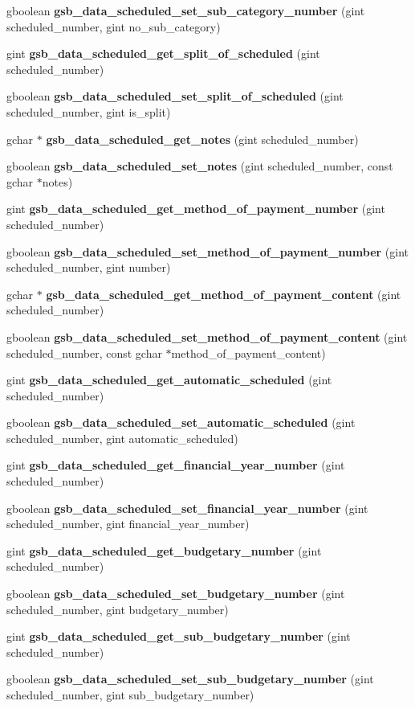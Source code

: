 \begin{DoxyCompactItemize}
gboolean {\bf gsb\_\-data\_\-scheduled\_\-set\_\-sub\_\-category\_\-number} (gint scheduled\_\-number, gint no\_\-sub\_\-category)
\item 
gint {\bf gsb\_\-data\_\-scheduled\_\-get\_\-split\_\-of\_\-scheduled} (gint scheduled\_\-number)
\item 
gboolean {\bf gsb\_\-data\_\-scheduled\_\-set\_\-split\_\-of\_\-scheduled} (gint scheduled\_\-number, gint is\_\-split)
\item 
gchar $\ast$ {\bf gsb\_\-data\_\-scheduled\_\-get\_\-notes} (gint scheduled\_\-number)
\item 
gboolean {\bf gsb\_\-data\_\-scheduled\_\-set\_\-notes} (gint scheduled\_\-number, const gchar $\ast$notes)
\item 
gint {\bf gsb\_\-data\_\-scheduled\_\-get\_\-method\_\-of\_\-payment\_\-number} (gint scheduled\_\-number)
\item 
gboolean {\bf gsb\_\-data\_\-scheduled\_\-set\_\-method\_\-of\_\-payment\_\-number} (gint scheduled\_\-number, gint number)
\item 
gchar $\ast$ {\bf gsb\_\-data\_\-scheduled\_\-get\_\-method\_\-of\_\-payment\_\-content} (gint scheduled\_\-number)
\item 
gboolean {\bf gsb\_\-data\_\-scheduled\_\-set\_\-method\_\-of\_\-payment\_\-content} (gint scheduled\_\-number, const gchar $\ast$method\_\-of\_\-payment\_\-content)
\item 
gint {\bf gsb\_\-data\_\-scheduled\_\-get\_\-automatic\_\-scheduled} (gint scheduled\_\-number)
\item 
gboolean {\bf gsb\_\-data\_\-scheduled\_\-set\_\-automatic\_\-scheduled} (gint scheduled\_\-number, gint automatic\_\-scheduled)
\item 
gint {\bf gsb\_\-data\_\-scheduled\_\-get\_\-financial\_\-year\_\-number} (gint scheduled\_\-number)
\item 
gboolean {\bf gsb\_\-data\_\-scheduled\_\-set\_\-financial\_\-year\_\-number} (gint scheduled\_\-number, gint financial\_\-year\_\-number)
\item 
gint {\bf gsb\_\-data\_\-scheduled\_\-get\_\-budgetary\_\-number} (gint scheduled\_\-number)
\item 
gboolean {\bf gsb\_\-data\_\-scheduled\_\-set\_\-budgetary\_\-number} (gint scheduled\_\-number, gint budgetary\_\-number)
\item 
gint {\bf gsb\_\-data\_\-scheduled\_\-get\_\-sub\_\-budgetary\_\-number} (gint scheduled\_\-number)
\item 
gboolean {\bf gsb\_\-data\_\-scheduled\_\-set\_\-sub\_\-budgetary\_\-number} (gint scheduled\_\-number, gint sub\_\-budgetary\_\-number)

\end{DoxyCompactItemize}
